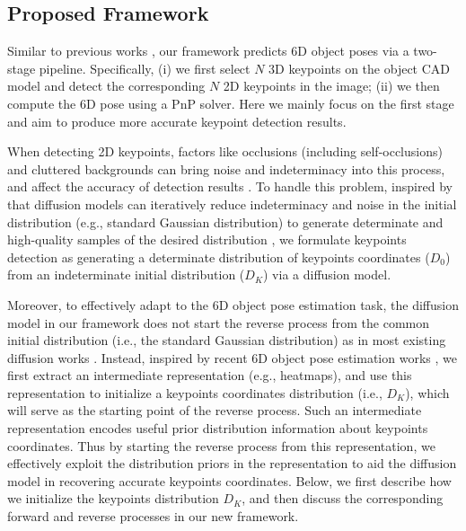 \documentclass[10pt,twocolumn,letterpaper]{article}
\begin{document}
\subsection{Proposed Framework}
\label{Sec:training}
Similar to previous works \cite{su2022zebrapose, peng2019pvnet, hu2019segmentation}, our framework predicts 6D object poses via a two-stage pipeline.
Specifically, (i) we first select $N$ 3D keypoints on the object CAD model and detect the corresponding $N$ 2D keypoints in the image; 
(ii) we then compute the 6D pose using a PnP solver. 
Here we mainly focus on the first stage and aim to produce more accurate keypoint detection results. 

When detecting 2D keypoints, factors like occlusions (including self-occlusions) and cluttered backgrounds can bring noise and indeterminacy into this process, and affect the accuracy of detection results \cite{peng2019pvnet, hu2019segmentation}.
To handle this problem, inspired by that diffusion models can iteratively reduce indeterminacy and noise in the initial distribution (e.g., standard Gaussian distribution) to generate determinate and high-quality samples of the desired distribution \cite{gu2022stochastic,gong2023diffpose}, 
we formulate keypoints detection as generating a determinate distribution of keypoints coordinates ($D_0$) from an indeterminate initial distribution 
($D_K$) via a diffusion model.

Moreover, to effectively adapt to the 6D object pose estimation task, the diffusion model in our framework does not start the reverse process from the common initial distribution 
(i.e., the standard Gaussian distribution) as in most existing diffusion works \cite{NEURIPS2020_DDPM, dhariwal2021diffusion, song2021denoising}.
Instead, inspired by recent 6D object pose estimation works \cite{castro2023crt, wang2021gdr, chen2020end}, we first extract an intermediate representation (e.g., heatmaps), and use this representation to initialize a keypoints coordinates distribution (i.e., $D_K$), which will serve as the starting point of the reverse process.
Such an intermediate representation encodes useful prior distribution information about keypoints coordinates.
Thus by starting the reverse process from this representation, we effectively exploit the distribution priors in the representation to aid the diffusion model in recovering accurate keypoints coordinates. 
Below, we first describe how we initialize the keypoints distribution $D_K$, and then discuss the corresponding forward and reverse processes in our new framework.
\end{document}
